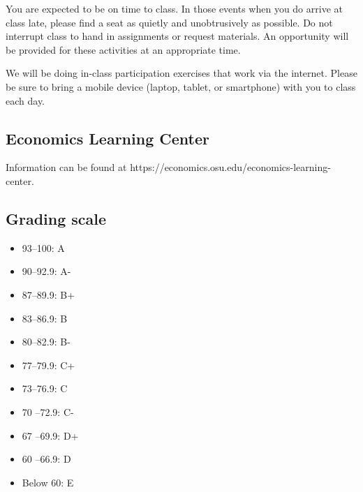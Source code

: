 \documentclass[12pt]{article}
\begin{document}
You are expected to be on time to class.
In those events when you do arrive at class late, please find a seat as quietly and unobtrusively as possible.
Do not interrupt class to hand in assignments or request materials.
An opportunity will be provided for these activities at an appropriate time.

We will be doing in-class participation exercises that work via the internet.
Please be sure to bring a mobile device (laptop, tablet, or smartphone) with you to class each day.

\subsection*{Economics Learning Center}

Information can be found at https://economics.osu.edu/economics-learning-center.

\subsection*{Grading scale}
\begin{itemize}
    \item 93–100: A
    \item 90–92.9: A-
    \item 87–89.9: B+
    \item 83–86.9: B
    \item 80–82.9: B-
    \item 77–79.9: C+
    \item 73–76.9: C
    \item 70 –72.9: C-
    \item 67 –69.9: D+
    \item 60 –66.9: D
    \item Below 60: E
\end{itemize}








\printbibliography
\end{document}

